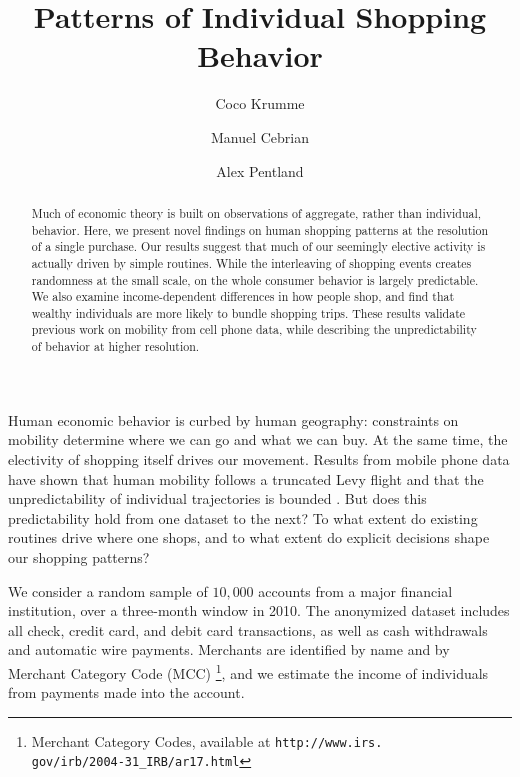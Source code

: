\documentclass[twocolumn,floatfix]{revtex4}
\begin{document}
\title{Patterns of Individual Shopping Behavior}

\author{Coco Krumme}
\author{Manuel Cebrian}
\author{Alex Pentland}

\begin{abstract}
Much of economic theory is built on observations of aggregate, rather than individual, behavior. Here, we present novel findings on human shopping patterns at the resolution of a single purchase. Our results suggest that much of our seemingly elective activity is actually driven by simple routines. While the interleaving of shopping events creates randomness at the small scale, on the whole consumer behavior is largely predictable. We also examine income-dependent differences in how people shop, and find that wealthy individuals are more likely to bundle shopping trips. These results validate previous work on mobility from cell phone data, while describing the unpredictability of behavior at higher resolution. 

\end{abstract}

\maketitle

Human economic behavior is curbed by human geography: constraints on mobility determine where we can go and what we can buy. At the same time, the electivity of shopping itself drives our movement. Results from mobile phone data have shown that human mobility follows a truncated Levy flight \cite{gonzalez2008understanding}  and that the unpredictability of individual trajectories is bounded \cite{song2010limits}. But does this predictability hold from one dataset to the next? To what extent do existing routines drive where one shops, and to what extent do explicit decisions shape our shopping patterns? 

We consider a random sample of $10,000$ accounts from a major financial institution, over a three-month window in 2010. The anonymized dataset includes all check, credit card, and debit card transactions, as well as cash withdrawals and automatic wire payments. Merchants are identified by name and by Merchant Category Code (MCC) \footnote{Merchant Category Codes, available at {\tt http://www.irs.\\gov/irb/2004-31\_IRB/ar17.html}}, and we estimate the income of individuals from payments made into the account.  
\end{document}
